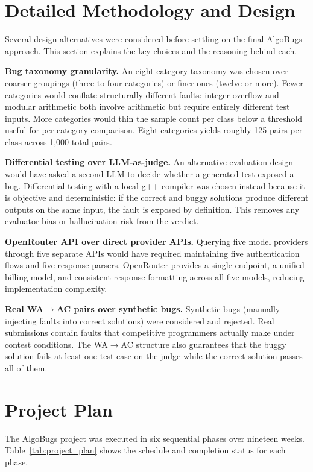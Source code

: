 \section{Detailed Methodology and Design}

Several design alternatives were considered before settling on the final AlgoBugs approach. This section explains the key choices and the reasoning behind each.

\textbf{Bug taxonomy granularity.} An eight-category taxonomy was chosen over coarser groupings (three to four categories) or finer ones (twelve or more). Fewer categories would conflate structurally different faults: integer overflow and modular arithmetic both involve arithmetic but require entirely different test inputs. More categories would thin the sample count per class below a threshold useful for per-category comparison. Eight categories yields roughly 125 pairs per class across 1,000 total pairs.

\textbf{Differential testing over LLM-as-judge.} An alternative evaluation design would have asked a second LLM to decide whether a generated test exposed a bug. Differential testing with a local g++ compiler was chosen instead because it is objective and deterministic: if the correct and buggy solutions produce different outputs on the same input, the fault is exposed by definition. This removes any evaluator bias or hallucination risk from the verdict.

\textbf{OpenRouter API over direct provider APIs.} Querying five model providers through five separate APIs would have required maintaining five authentication flows and five response parsers. OpenRouter provides a single endpoint, a unified billing model, and consistent response formatting across all five models, reducing implementation complexity.

\textbf{Real WA$\to$AC pairs over synthetic bugs.} Synthetic bugs (manually injecting faults into correct solutions) were considered and rejected. Real submissions contain faults that competitive programmers actually make under contest conditions. The WA$\to$AC structure also guarantees that the buggy solution fails at least one test case on the judge while the correct solution passes all of them.

\section{Project Plan}

The AlgoBugs project was executed in six sequential phases over nineteen weeks. Table~\ref{tab:project_plan} shows the schedule and completion status for each phase.

